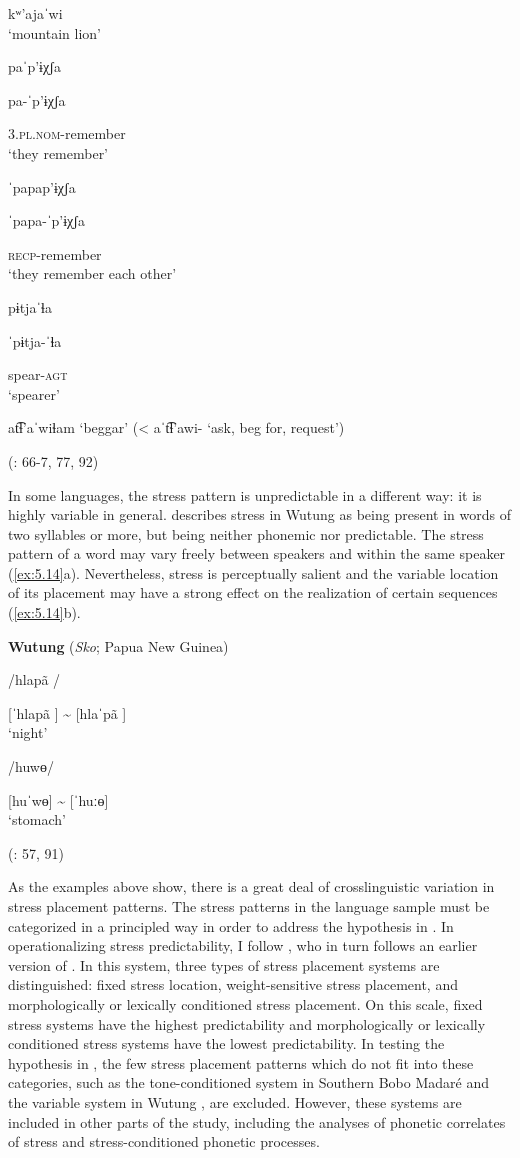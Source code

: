 \ex  kʷ’ajaˈwi\\
\glt ‘mountain lion’

\ex  paˈp’ɨχʃa

pa-ˈp’ɨχʃa

3.\textsc{pl.nom}-remember\\
\glt ‘they remember’

\ex  ˈpapap’ɨχʃa

ˈpapa-ˈp’ɨχʃa

\textsc{recp}-remember\\
\glt ‘they remember each other’

\ex  pɨtjaˈɬa

ˈpɨtja-ˈɬa

spear-\textsc{agt}\\
\glt ‘spearer’

\ex  at͡ɬ’aˈwiɬam ‘beggar’ (< aˈt͡ɬ’awi- ‘ask, beg for, request’)

(\citealt{HargusBeavert2005}: 66-7, 77, 92)
\z
\z

  In some languages, the stress pattern is unpredictable in a different way: it is highly variable in general. \citet{Marmion2010} describes stress in Wutung as being present in words of two syllables or more, but being neither phonemic nor predictable. The stress pattern of a word may vary freely between speakers and within the same speaker (\ref{ex:5.14}a). Nevertheless, stress is perceptually salient and the variable location of its placement may have a strong effect on the realization of certain sequences (\ref{ex:5.14}b).

\ea\label{ex:5.14}
  \textbf{Wutung} (\textit{Sko}; Papua New Guinea)

\ea  /hlapã /

[ˈhlapã ] {\textasciitilde} [hlaˈpã ]\\
\glt ‘night’

\ex  /huwɵ/

[huˈwɵ] {\textasciitilde} [ˈhuːɵ]\\
\glt ‘stomach’

(\citealt{Marmion2010}: 57, 91)
\z
\z

  As the examples above show, there is a great deal of crosslinguistic variation in stress placement patterns. The stress patterns in the language sample must be categorized in a principled way in order to address the hypothesis in . In operationalizing stress predictability, I follow \citet{Schiering2007}, who in turn follows an earlier version of \citet{GoedemansvanderHulst2013a}. In this system, three types of stress placement systems are distinguished: fixed stress location, weight-sensitive stress placement, and morphologically or lexically conditioned stress placement. On this scale, fixed stress systems have the highest predictability and morphologically or lexically conditioned stress systems have the lowest predictability. In testing the hypothesis in , the few stress placement patterns which do not fit into these categories, such as the tone-conditioned system in Southern Bobo Madaré  and the variable system in Wutung , are excluded. However, these systems are included in other parts of the study, including the analyses of phonetic correlates of stress and stress-conditioned phonetic processes.

